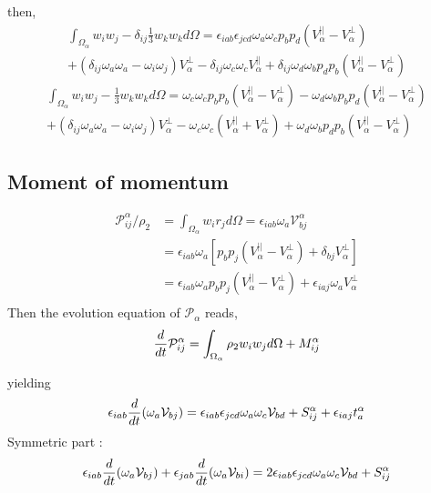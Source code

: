     
then, 
\begin{multline}
        \int_{\Omega_\alpha} 
        w_i w_j
        - \delta_{ij}\frac{1}{3}w_k w_k
        d\Omega
        = 
        \epsilon_{iab} \epsilon_{jcd}
        \omega_a
        \omega_c
        p_bp_d (V_\alpha^{||} - V_\alpha^\bot) \\
        + (\delta_{ij} 
        \omega_a
        \omega_a
         - \omega_i \omega_j)
         V_\alpha^\bot 
         - \delta_{ij}\omega_c\omega_c V_\alpha^{||} 
         + \delta_{ij}\omega_d \omega_b p_dp_b (V_\alpha^{||} - V_\alpha^\bot)
\end{multline}
\begin{multline}
        \int_{\Omega_\alpha} 
        w_i w_j
        - \frac{1}{3}w_k w_k
        d\Omega
        = 
        \omega_c
        \omega_c
        p_bp_b (V_\alpha^{||} - V_\alpha^\bot) 
        - \omega_d
        \omega_b
        p_bp_d (V_\alpha^{||} - V_\alpha^\bot) \\
        + (\delta_{ij} 
        \omega_a
        \omega_a
         - \omega_i \omega_j)
         V_\alpha^\bot 
         - \omega_c\omega_c(V_\alpha^{||} + V_\alpha^\bot) 
         + \omega_d \omega_b p_dp_b (V_\alpha^{||} - V_\alpha^\bot)
\end{multline}


\subsection{Moment of momentum}
\begin{align*}
    \mathcal{P}^\alpha_{ij} / \rho_2 
    &= \int_{\Omega_\alpha} 
     w_i r_j
    d\Omega
    = \epsilon_{iab}\omega_a \mathcal{V}^\alpha_{bj}\\
    &= \epsilon_{iab}\omega_a 
    \left[p_bp_j (V_\alpha^{||} - V_\alpha^\bot) 
    + \delta_{bj} V_\alpha^\bot\right]\\
    &= \epsilon_{iab}\omega_a p_bp_j (V_\alpha^{||} - V_\alpha^\bot) 
    + \epsilon_{iaj}\omega_a V_\alpha^\bot\\
\end{align*}
Then the evolution equation of $\mathcal{P}_\alpha$ reads, 
\begin{equation}
    \frac{d}{d t}\mathcal{P}^\alpha_{ij}
    = \int_{\Omega_\alpha} 
        \rho_2 w_i w_j
        d\Omega
        + M^\alpha_{ij}
\end{equation}


yielding  
\begin{equation*}
    \epsilon_{iab}\frac{d}{d t}(\omega_a \mathcal{V}_{bj})
    = 
    \epsilon_{iab} \epsilon_{jcd}
    \omega_a
    \omega_c
    \mathcal{V}_{bd}
    + S^\alpha_{ij}
    + \epsilon_{iaj} t^\alpha_{a}
\end{equation*}
Symmetric part : 
\begin{equation*}
    \epsilon_{iab}\frac{d}{d t}(\omega_a \mathcal{V}_{bj})
    + \epsilon_{jab}\frac{d}{d t}(\omega_a \mathcal{V}_{bi})
    = 
    2 \epsilon_{iab} \epsilon_{jcd}
    \omega_a
    \omega_c
    \mathcal{V}_{bd}
    + S^\alpha_{ij}
\end{equation*}


